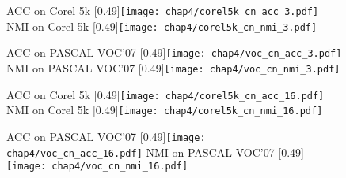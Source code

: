 \begin{figure}[t]
	\centering
					{ACC on  Corel 5k}
					[0.49\textwidth]{\texttt{[image: chap4/corel5k\_cn\_acc\_3.pdf]}}
                    \label{fig4:3viewacc1}
					{NMI on  Corel 5k}
                    [0.49\textwidth]{\texttt{[image: chap4/corel5k\_cn\_nmi\_3.pdf]}}
                    \label{fig4:3viewnmi1}
                    
	\centering
					{ACC on  PASCAL VOC'07}
					[0.49\textwidth]{\texttt{[image: chap4/voc\_cn\_acc\_3.pdf]}}
                    \label{fig4:3viewacc2}
					{NMI on  PASCAL VOC'07}
					[0.49\textwidth]{\texttt{[image: chap4/voc\_cn\_nmi\_3.pdf]}}
                    \label{fig4:3viewnmi2}
	\label{fig4:3view}
\end{figure} 


\begin{figure}[t]
	\centering
					{ACC on  Corel 5k}
					[0.49\textwidth]{\texttt{[image: chap4/corel5k\_cn\_acc\_16.pdf]}}
                    \label{fig4:16viewacc1}
					{NMI on  Corel 5k}
                    [0.49\textwidth]{\texttt{[image: chap4/corel5k\_cn\_nmi\_16.pdf]}}
                    \label{fig4:16viewnmi1}
                    
	\centering
					{ACC on  PASCAL VOC'07}
					[0.49\textwidth]{\texttt{[image: chap4/voc\_cn\_acc\_16.pdf]}}
                    \label{fig4:16viewacc2}
					{NMI on  PASCAL VOC'07}
					[0.49\textwidth]{\texttt{[image: chap4/voc\_cn\_nmi\_16.pdf]}}
                    \label{fig4:16viewnmi2}
	\label{fig4:16view}
\end{figure} 

